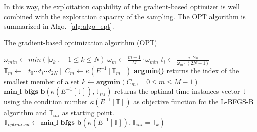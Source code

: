 In this way, the exploitation capability of the gradient-based
optimizer is well combined with the exploration capacity of the
sampling. The OPT algorithm is summarized in Algo.~\ref{alg:algo_opt}.
\begin{algorithm}
\caption{The gradient-based optimization algorithm (OPT)}
\label{alg:algo_opt}
\begin{algorithmic}
\STATE $\omega_{min} \leftarrow min \left( |\omega_k |,\quad 1 \leqslant k \leqslant N \right)$
    \STATE $\omega_m \leftarrow \frac{m + 1}{M} \cdot \omega_{min}$
        \STATE $t_i \leftarrow \displaystyle\frac{i \cdot 2 \pi}{\omega_m \cdot (2N + 1)}$
    \ENDFOR
    \STATE $\mathbb{T}_m \leftarrow [t_0 \cdots  t_i \cdots t_{2N}]$
    \STATE $C_m \leftarrow \kappa \left(E^{-1} \left[\mathbb{T}_m \right] \right)$
\ENDFOR
\STATE \textbf{argmin()} returns the index of the smallest member of a set
\STATE $k \leftarrow \textbf{argmin}\left(C_m,\quad 0\leqslant m \leqslant M-1\right)$
\STATE $\textbf{min\_l-bfgs-b}\left(\kappa \left(E^{-1} \left[\mathbb{T}\right]\right), \mathbb{T}_{ini}\right)$ returns the optimal 
time instances vector $\mathbb{T}$ using the condition number $\kappa\left(E^{-1} \left[\mathbb{T}\right]\right)$ as objective function 
for the L-BFGS-B algorithm and  $\mathbb{T}_{ini}$ as starting point.
\STATE $\mathbb{T}_{optimized} \leftarrow 
  \textbf{min\_l-bfgs-b}\left(\kappa\left(E^{-1} \left[\mathbb{T}\right]\right), \mathbb{T}_{ini}=\mathbb{T}_k\right)$
\end{algorithmic}
\end{algorithm}

